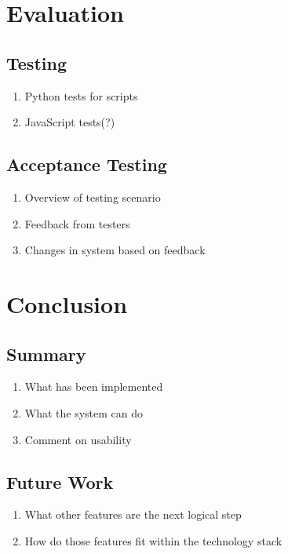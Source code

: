 \documentclass{l4proj}
\begin{document}
\chapter{Evaluation}
\section{Testing}
\begin{enumerate}
	\item Python tests for scripts
	\item JavaScript tests(?)
\end{enumerate}
\section{Acceptance Testing}
\begin{enumerate}
	\item Overview of testing scenario
	\item Feedback from testers
	\item Changes in system based on feedback
\end{enumerate}

\chapter{Conclusion}
\section{Summary}
\begin{enumerate}
	\item What has been implemented
	\item What the system can do
	\item Comment on usability
\end{enumerate}
\section{Future Work}
\begin{enumerate}
	\item What other features are the next logical step
	\item How do those features fit within the technology stack
\end{enumerate}
\end{document}
